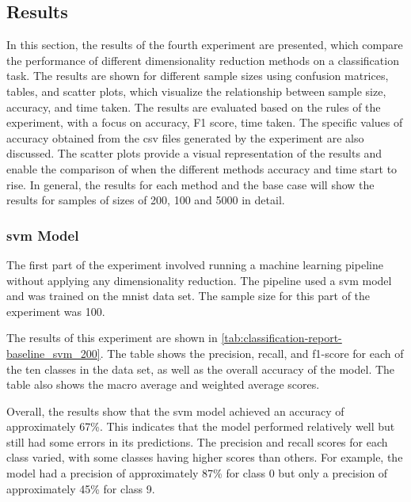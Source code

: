 \subsection{Results}\label{subsec:experiment_4_results}
In this section, the results of the fourth experiment are presented, which compare the performance of different dimensionality reduction methods on a classification task. The results are shown for different sample sizes using confusion matrices, tables, and scatter plots, which visualize the relationship between sample size, accuracy, and time taken. The results are evaluated based on the rules of the experiment, with a focus on accuracy, F1 score, time taken. The specific values of accuracy obtained from the csv files generated by the experiment are also discussed. The scatter plots provide a visual representation of the results and enable the comparison of when the different methods accuracy and time start to rise. In general, the results for each method and the base case will show the results for samples of sizes of 200, 100 and 5000 in detail.

\subsubsection{\gls{svm} Model}\label{subsubsec:experiment_4_no_dimmensionality_reduction}





The first part of the experiment involved running a machine learning pipeline without applying any dimensionality reduction. The pipeline used a \gls{svm} model and was trained on the \gls{mnist} data set. The sample size for this part of the experiment was 100.

The results of this experiment are shown in \ref{tab:classification-report-baseline_svm_200}. The table shows the precision, recall, and f1-score for each of the ten classes in the data set, as well as the overall accuracy of the model. The table also shows the macro average and weighted average scores.

Overall, the results show that the \gls{svm} model achieved an accuracy of approximately 67\%. This indicates that the model performed relatively well but still had some errors in its predictions. The precision and recall scores for each class varied, with some classes having higher scores than others. For example, the model had a precision of approximately 87\% for class 0 but only a precision of approximately 45\% for class 9. 

